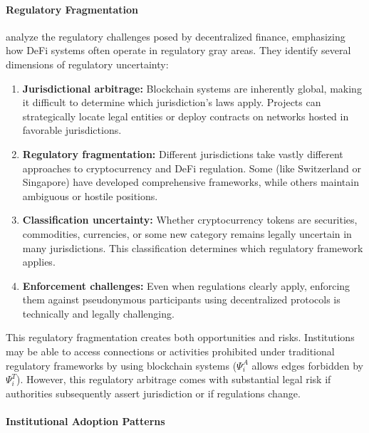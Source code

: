 \paragraph{Regulatory Fragmentation}

 analyze the regulatory challenges posed by decentralized finance, emphasizing how DeFi systems often operate in regulatory gray areas. They identify several dimensions of regulatory uncertainty:

\begin{enumerate}
    \item \textbf{Jurisdictional arbitrage:} Blockchain systems are inherently global, making it difficult to determine which jurisdiction's laws apply. Projects can strategically locate legal entities or deploy contracts on networks hosted in favorable jurisdictions.
    
    \item \textbf{Regulatory fragmentation:} Different jurisdictions take vastly different approaches to cryptocurrency and DeFi regulation. Some (like Switzerland or Singapore) have developed comprehensive frameworks, while others maintain ambiguous or hostile positions.
    
    \item \textbf{Classification uncertainty:} Whether cryptocurrency tokens are securities, commodities, currencies, or some new category remains legally uncertain in many jurisdictions. This classification determines which regulatory framework applies.
    
    \item \textbf{Enforcement challenges:} Even when regulations clearly apply, enforcing them against pseudonymous participants using decentralized protocols is technically and legally challenging.
\end{enumerate}

This regulatory fragmentation creates both opportunities and risks. Institutions may be able to access connections or activities prohibited under traditional regulatory frameworks by using blockchain systems ($\Psi_i^A$ allows edges forbidden by $\Psi_i^T$). However, this regulatory arbitrage comes with substantial legal risk if authorities subsequently assert jurisdiction or if regulations change.

\paragraph{Institutional Adoption Patterns}

